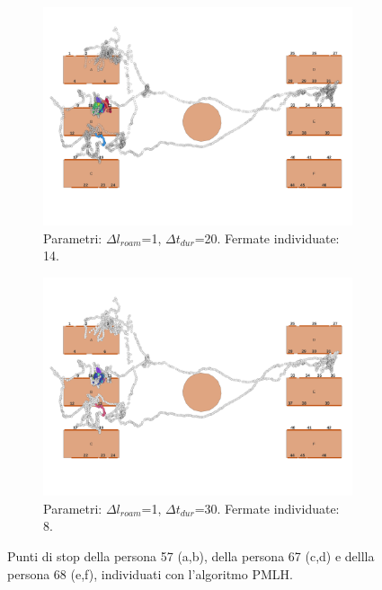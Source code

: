 \documentclass[12pt]{article}
\begin{document}
\begin{figure}[htb!]
    \hfill
    \begin{subfigure}[b]{0.45\textwidth}
        \centering
        \includegraphics[width=\textwidth]{images/stop_points_p68_PMLH_r1_s20.png}
        \caption{Parametri: $\Delta l_{roam}$=1, $\Delta t_{dur}$=20. Fermate individuate: 14.}
        \label{stop_points_p68_PMLH_r1_s20}
    \end{subfigure}
    \hfill
    \begin{subfigure}[b]{0.45\textwidth}
        \centering
        \includegraphics[width=\textwidth]{images/stop_points_p68_PMLH_r1_s30.png}
        \caption{Parametri: $\Delta l_{roam}$=1, $\Delta t_{dur}$=30. Fermate individuate: 8.}
        \label{stop_points_p68_PMLH_r1_s30}
    \end{subfigure}
    \hfill
    \caption{Punti di stop della persona 57 (a,b), della persona 67 (c,d) e dellla persona 68 (e,f), individuati con l'algoritmo PMLH.}
    \label{stop_points_PMLH}
\end{figure}
\end{document}
